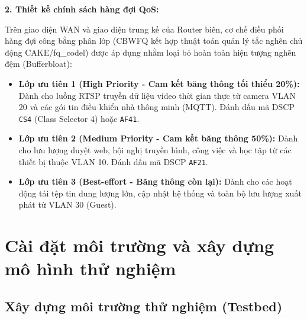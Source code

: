 \textbf{2. Thiết kế chính sách hàng đợi QoS:}

Trên giao diện WAN và giao diện trung kế của Router biên, cơ chế điều phối hàng đợi công bằng phân lớp (CBWFQ kết hợp thuật toán quản lý tắc nghẽn chủ động CAKE/fq\_codel) được áp dụng nhằm loại bỏ hoàn toàn hiện tượng nghẽn đệm (Bufferbloat):
\begin{itemize}
    \item \textbf{Lớp ưu tiên 1 (High Priority - Cam kết băng thông tối thiểu 20\%):} Dành cho luồng RTSP truyền dữ liệu video thời gian thực từ camera VLAN 20 và các gói tin điều khiển nhà thông minh (MQTT). Đánh dấu mã DSCP \texttt{CS4} (Class Selector 4) hoặc \texttt{AF41}.
    \item \textbf{Lớp ưu tiên 2 (Medium Priority - Cam kết băng thông 50\%):} Dành cho lưu lượng duyệt web, hội nghị truyền hình, công việc và học tập từ các thiết bị thuộc VLAN 10. Đánh dấu mã DSCP \texttt{AF21}.
    \item \textbf{Lớp ưu tiên 3 (Best-effort - Băng thông còn lại):} Dành cho các hoạt động tải tệp tin dung lượng lớn, cập nhật hệ thống và toàn bộ lưu lượng xuất phát từ VLAN 30 (Guest).
\end{itemize}

\section{Cài đặt môi trường và xây dựng mô hình thử nghiệm}
\label{sec:cai-dat-moi-truong-mo-hinh}

\subsection{Xây dựng môi trường thử nghiệm (Testbed)}
\label{subsec:xay-dung-testbed}

